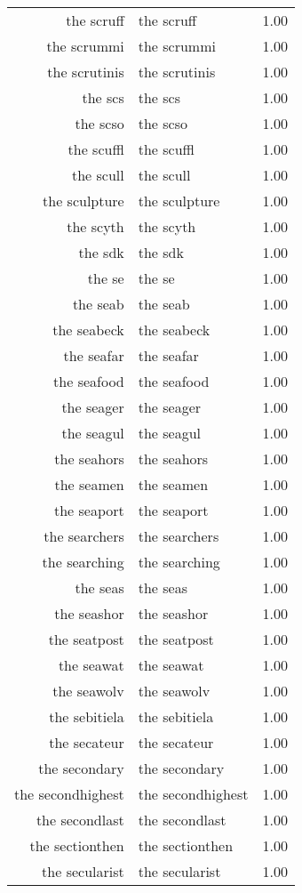 \begin{table}[ht]
\begin{tabular}{rlr}
  the scruff & the scruff & 1.00 \\ 
  the scrummi & the scrummi & 1.00 \\ 
  the scrutinis & the scrutinis & 1.00 \\ 
  the scs & the scs & 1.00 \\ 
  the scso & the scso & 1.00 \\ 
  the scuffl & the scuffl & 1.00 \\ 
  the scull & the scull & 1.00 \\ 
  the sculpture & the sculpture & 1.00 \\ 
  the scyth & the scyth & 1.00 \\ 
  the sdk & the sdk & 1.00 \\ 
  the se & the se & 1.00 \\ 
  the seab & the seab & 1.00 \\ 
  the seabeck & the seabeck & 1.00 \\ 
  the seafar & the seafar & 1.00 \\ 
  the seafood & the seafood & 1.00 \\ 
  the seager & the seager & 1.00 \\ 
  the seagul & the seagul & 1.00 \\ 
  the seahors & the seahors & 1.00 \\ 
  the seamen & the seamen & 1.00 \\ 
  the seaport & the seaport & 1.00 \\ 
  the searchers & the searchers & 1.00 \\ 
  the searching & the searching & 1.00 \\ 
  the seas & the seas & 1.00 \\ 
  the seashor & the seashor & 1.00 \\ 
  the seatpost & the seatpost & 1.00 \\ 
  the seawat & the seawat & 1.00 \\ 
  the seawolv & the seawolv & 1.00 \\ 
  the sebitiela & the sebitiela & 1.00 \\ 
  the secateur & the secateur & 1.00 \\ 
  the secondary & the secondary & 1.00 \\ 
  the secondhighest & the secondhighest & 1.00 \\ 
  the secondlast & the secondlast & 1.00 \\ 
  the sectionthen & the sectionthen & 1.00 \\ 
  the secularist & the secularist & 1.00 \\ 

\end{tabular}
\end{table}
